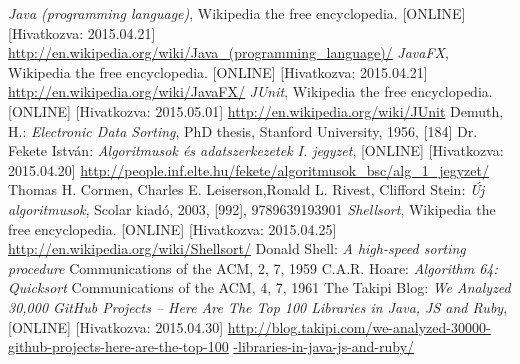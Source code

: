 \documentclass{elteikthesis}
\begin{document}
\begin{thebibliography}{widest entry}
\emph{Java (programming language)},
Wikipedia the free encyclopedia.
[ONLINE] [Hivatkozva: 2015.04.21]
\url{http://en.wikipedia.org/wiki/Java_(programming_language)/}
\emph{JavaFX},
Wikipedia the free encyclopedia.
[ONLINE] [Hivatkozva: 2015.04.21]
\url{http://en.wikipedia.org/wiki/JavaFX/}
\emph{JUnit},
Wikipedia the free encyclopedia.
[ONLINE] [Hivatkozva: 2015.05.01]
\url{http://en.wikipedia.org/wiki/JUnit}
Demuth, H.:
\emph{Electronic Data Sorting},
PhD thesis, Stanford University,
1956, [184]
Dr. Fekete István:
\emph{Algoritmusok és adatszerkezetek I. jegyzet},
[ONLINE] [Hivatkozva: 2015.04.20] \url{http://people.inf.elte.hu/fekete/algoritmusok_bsc/alg_1_jegyzet/}
Thomas H. Cormen, Charles E. Leiserson,Ronald L. Rivest, Clifford Stein:
\emph{Új algoritmusok},
Scolar kiadó, 2003,
[992], 9789639193901
\emph{Shellsort},
Wikipedia the free encyclopedia.
[ONLINE] [Hivatkozva: 2015.04.25]
\url{http://en.wikipedia.org/wiki/Shellsort/}
Donald Shell:
\emph{A high-speed sorting procedure}
Communications of the ACM, 2, 7, 1959
C.A.R. Hoare:
\emph{Algorithm 64: Quicksort}
Communications of the ACM, 4, 7, 1961
The Takipi Blog:
\emph{We Analyzed 30,000 GitHub Projects – Here Are The Top 100 Libraries in Java, JS and Ruby},
[ONLINE] [Hivatkozva: 2015.04.30] \url{http://blog.takipi.com/we-analyzed-30000-github-projects-here-are-the-top-100}
\url{-libraries-in-java-js-and-ruby/}
\end{thebibliography}
\end{document}
